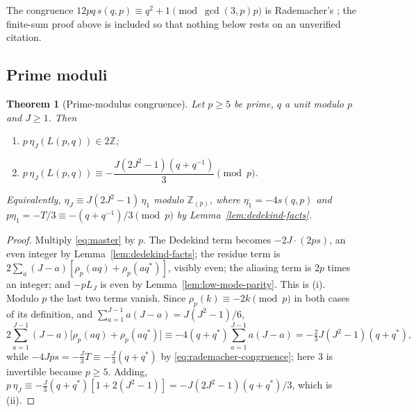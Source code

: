 \documentclass[11pt]{article}
\newtheorem{theorem}{Theorem}[section]
\theoremstyle{definition}
\newcommand{\Z}{\mathbb Z}
\begin{document}
The congruence $12pq\,s(q,p)\equiv q^2+1\pmod{\gcd(3,p)p}$ is
Rademacher's \cite[Ch.~3]{RademacherGrosswald1972}; the finite-sum proof
above is included so that nothing below rests on an unverified citation.

\subsection{Prime moduli}

\begin{theorem}[Prime-modulus congruence]
\label{thm:E}
Let $p\geq5$ be prime, $q$ a unit modulo $p$ and $J\geq1$.  Then
\begin{enumerate}[label=(\roman*)]
\item $p\,\eta_J(L(p,q))\in2\Z$;
\item $p\,\eta_J(L(p,q))\equiv-\dfrac{J(2J^2-1)(q+q^{-1})}3\pmod p$.
\end{enumerate}
Equivalently, $\eta_J\equiv J(2J^2-1)\,\eta_1$ modulo $\Z_{(p)}$, where
$\eta_1=-4s(q,p)$ and
$p\eta_1=-T/3\equiv-(q+q^{-1})/3\pmod p$ by
Lemma~\ref{lem:dedekind-facts}.
\end{theorem}

\begin{proof}
Multiply \eqref{eq:master} by $p$.  The Dedekind term becomes
$-2J\cdot(2ps)$, an even integer by Lemma~\ref{lem:dedekind-facts}; the
residue term is $2\sum_a(J-a)[\rho_p(aq)+\rho_p(aq^*)]$, visibly even;
the aliasing term is $2p$ times an integer; and $-pL_J$ is even by
Lemma~\ref{lem:low-mode-parity}.  This is (i).  Modulo $p$ the last two
terms vanish.  Since $\rho_p(k)\equiv-2k\pmod p$ in both cases of its
definition, and $\sum_{a=1}^{J-1}a(J-a)=J(J^2-1)/6$,
\[
 2\sum_{a=1}^{J-1}(J-a)\bigl[\rho_p(aq)+\rho_p(aq^*)\bigr]
 \equiv-4(q+q^*)\sum_{a=1}^{J-1}a(J-a)
 =-\tfrac23J(J^2-1)(q+q^*),
\]
while $-4Jps=-\tfrac J3T\equiv-\tfrac J3(q+q^*)$ by
\eqref{eq:rademacher-congruence}; here $3$ is invertible because
$p\geq5$.  Adding, $p\,\eta_J\equiv-\tfrac J3(q+q^*)[1+2(J^2-1)]
=-J(2J^2-1)(q+q^*)/3$, which is (ii).
\end{proof}
\end{document}

